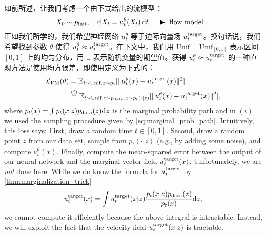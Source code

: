 如前所述，让我们考虑一个由下式给出的流模型：
\begin{align}
\label{eq:ode_model}
 X_0&\sim p_{\rm{init}},\quad \mathrm{d} X_t = u_t^\theta(X_t)\,\mathrm{d} t. &&\blacktriangleright\,\,\text{flow model}
\end{align}
正如我们所学的，我们希望神经网络 $u_t^\theta$ 等于边际向量场 $u^{\text{target}}_t$。换句话说，我们希望找到参数 $\theta$ 使得 $u_t^\theta\approx u^{\text{target}}_t$。在下文中，我们用 $\text{Unif}=\text{Unif}_{[0,1]}$ 表示区间 $[0,1]$ 上的均匀分布，用 $\mathbb{E}$ 表示随机变量的期望值。获得 $u_t^\theta\approx u^{\text{target}}_t$ 的一种直观方法是使用均方误差，即使用定义为下式的：
\label{subsec:training_algorithm}
\begin{align}
    \label{eq:marginal_loss_function}
\mathcal{L}_{\text{FM}}(\theta)&=\mathbb{E}_{t\sim\text{Unif},x\sim p_t}[\|u_t^\theta(x) - u^{\text{target}}_t(x)\|^2]\\&\overset{(i)}{=} \mathbb{E}_{t\sim\text{Unif},z\sim p_{\rm{data}}, x\sim p_t(\cdot|z)}[\|u_t^\theta(x) - u^{\text{target}}_t(x)\|^2],
\end{align}
where $p_t(x)=\int p_t(x|z)p_{\rm{data}}(z) \mathrm{d} z$ is the marginal probability path and in $(i)$ we used the sampling procedure given by \cref{eq:marginal_prob_path}. Intuitively, this loss says: First, draw a random time $t \in [0,1]$. Second, draw a random point $z$ from our data set, sample from $p_t(\cdot|z)$ (e.g., by adding some noise), and compute $u_t^\theta(x)$. Finally, compute the mean-squared error between the output of our neural network and the marginal vector field $u^{\text{target}}_t(x)$. Unfortunately, we are \textit{not} done here. While we do know the formula for $u^{\text{target}}_t$ by \cref{thm:marginalization_trick}
\begin{align}
\label{eq:marginal_vector_field_stated_again}
    u^{\text{target}}_t(x) = \int u^{\text{target}}_t(x|z)\frac{ p_t(x|z)p_{\rm{data}}(z)}{p_t(x)}\mathrm{d} z,
\end{align}
we cannot compute it efficiently because the above integral is intractable. Instead, we will exploit the fact that the  velocity field $u^{\text{target}}_t(x|z)$ is tractable. %

